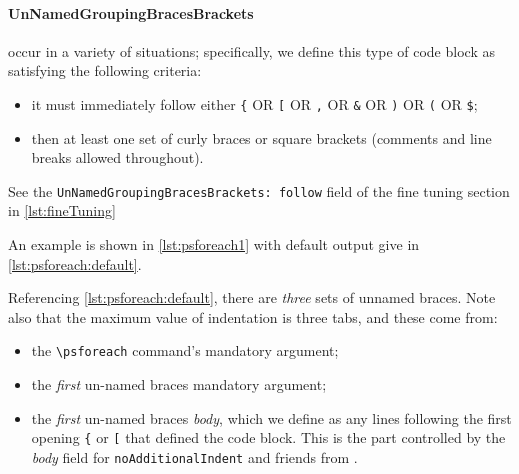 \documentclass[10pt]{article}
\begin{document}
 \paragraph{UnNamedGroupingBracesBrackets} occur in a variety of situations;
  specifically, we define this type of code block as satisfying the following
  criteria:
  \begin{itemize}
   \item it must immediately follow either \lstinline!{! OR \lstinline![! OR
         \lstinline!,! OR \lstinline!&! OR \lstinline!)! OR \lstinline!(! OR
         \lstinline!$!;
   \item then at least one set of curly braces or square brackets (comments and line
         breaks allowed throughout).
  \end{itemize}
  See the \texttt{UnNamedGroupingBracesBrackets: follow} field of the fine tuning section
  in \vref{lst:fineTuning} %

  \begin{example}
  An example is shown in \cref{lst:psforeach1} with default output give in
  \cref{lst:psforeach:default}.

  \begin{cmhtcbraster}
  \end{cmhtcbraster}

  Referencing \cref{lst:psforeach:default}, there are \emph{three} sets of unnamed
  braces. Note also that the maximum value of indentation is three tabs, and these come
  from:
  \begin{itemize}
   \item the \lstinline!\psforeach! command's mandatory argument;
   \item the \emph{first} un-named braces mandatory argument;
   \item the \emph{first} un-named braces \emph{body}, which we define as any lines
         following the first opening \lstinline!{! or \lstinline![! that defined the code
         block. This is the part controlled by the \emph{body} field for
         \texttt{noAdditionalIndent} and friends from .
  \end{itemize}
  \end{example}
\end{document}
